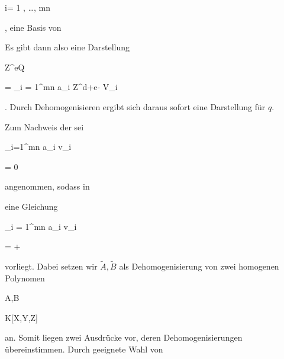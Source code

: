 { {}

 {i= 1 , \ldots , mn} {}

 {} {} {} {,}
eine Basis von

 Es gibt dann also eine Darstellung


\mavergleichskette

{\vergleichskette

{ Z^{e}Q
}

{ = }{ \sum_{i = 1}^{mn} a_i Z^{d+e-\ell} V_i
}

{  }{
}

{    }{
}

{   }{
}

}
{}{}{.}
Durch Dehomogenisieren ergibt sich daraus sofort eine Darstellung für $q$.


Zum Nachweis der
sei


\mavergleichskettedisp

{\vergleichskette

{ \sum_{i=1}^{mn} a_i v_i
}

{ =} { 0
}

{ } {
}

{ } {
}

{ } {
}

}
{}{}{}
angenommen, sodass in

 eine Gleichung


\mavergleichskettedisp

{\vergleichskette

{ \sum_{i = 1}^{mn} a_i v_i
}

{ =} {   +  
}

{ } {
}

{ } {
}

{ } {
}

}
{}{}{}
vorliegt. Dabei setzen wir $\tilde{  A  } , \tilde{  B  }$ als Dehomogenisierung von zwei homogenen Polynomen


\mavergleichskette

{\vergleichskette

{ A,B
}

{ \in }{ K[X,Y,Z]
}

{  }{
}

{    }{
}

{   }{
}

}
{}{}{}
an. Somit liegen zwei Ausdrücke
 {}
vor, deren Dehomogenisierungen übereinstimmen. Durch geeignete Wahl von

}
